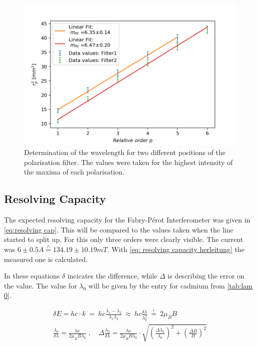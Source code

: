 \documentclass[]{article}
\begin{document}
\begin{figure}[H]
\centering
\includegraphics[width=1\textwidth]{Plots/Both_Filters.png}
\caption{Determination of the wavelength for two different positions of the polarisation filter. The values were taken for the highest intensity of the maxima of each polarisation.}
\label{fig: lambda sigma pm}
\end{figure}


\subsection{Resolving Capacity}
The expected resolving capacity for the Fabry-Pérot Interferometer was given in \autoref{eq:resolving cap}. This will be compared to the values taken when the line started to split up. For this only three orders were clearly visible. The current was $6\pm 0.5 A \overset{\land}{=} 134.19 \pm 10.19 mT$. 
With \autoref{eq: resolving capacity herleitung} the measured one is calculated.

In these equations $\delta$ incicates the difference, while $\Delta$ is describing the error on the value. The value for $\lambda_0$ will be given by the entry for cadmium from \autoref{tab:lam 0}.

\begin{align}
\delta E= hc \cdot k\ =\ hc \frac{\lambda_1-\lambda_2}{\lambda_1\lambda_2}\ \approx\ hc\frac{\delta \lambda}{\lambda_0^2}\ \overset{!}{=}\ 2\mu_B B 
\label{eq: delta E gleich}
\\
\frac{\lambda_0}{\delta \lambda} = \frac{hc}{2\mu_B B \lambda_0} \;,\quad \Delta \frac{\lambda_0}{\delta \lambda} = \frac{hc}{2\mu_B B \lambda_0} \cdot \sqrt{\left(\frac{\Delta \lambda_0}{\lambda_0}\right)^2 + \left(\frac{\Delta B}{B}\right)^2}
\label{eq: resolving capacity herleitung}
\end{align}
\end{document}
